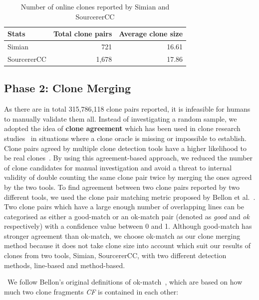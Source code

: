 \documentclass[10pt,journal,compsoc]{IEEEtran}
\begin{document}
\begin{table}
	\centering
	\caption{Number of online clones reported by Simian and SourcererCC}
	\label{tab:orig_stats}
	\begin{tabular}{lrr}
		\toprule
		Stats & \multicolumn{1}{c}{Total clone pairs} & \multicolumn{1}{c}{Average clone size} \\
		\midrule
		Simian & 721 & 16.61 \\
		SourcererCC & 1,678 & 17.86 \\
		\bottomrule
	\end{tabular} %
\end{table}

\subsection{Phase 2: Clone Merging}
As there are in total 315,786,118 clone pairs reported, it is infeasible for
humans to manually validate them all. Instead of investigating a random sample,
we adopted the idea of \textbf{clone agreement} which has been used in clone
research studies~\cite{Funaro2010, Wang2013,cr2016ssbse} in situations where a
clone oracle is missing or impossible to establish. Clone pairs agreed by
multiple clone detection tools have a higher likelihood to be real
clones~\cite{cr2016ssbse}. By using this agreement-based approach, we reduced
the number of clone candidates for manual investigation and avoid a threat to
internal validity of double counting the same clone pair twice by merging the
ones agreed by the two tools. To find agreement between two clone pairs
reported by two different tools, we used the clone pair matching metric proposed
by Bellon et al.~\cite{Bellon2007}. Two clone pairs which have a large enough
number of overlapping lines can be categorised as either a good-match or an
ok-match pair (denoted as \textit{good} and \textit{ok} respectively) with a
confidence value between 0 and 1. Although good-match has stronger
agreement than ok-match, we choose ok-match as our clone merging method because 
it does not take clone size into account which suit our results of clones from
two tools, Simian, SourcererCC, with two different detection methods, 
line-based and method-based. 

\ We follow Bellon's original definitions of ok-match~\cite{Bellon2007}, which are based on how much two clone
fragments \textit{CF} is contained in each other:
\end{document}
